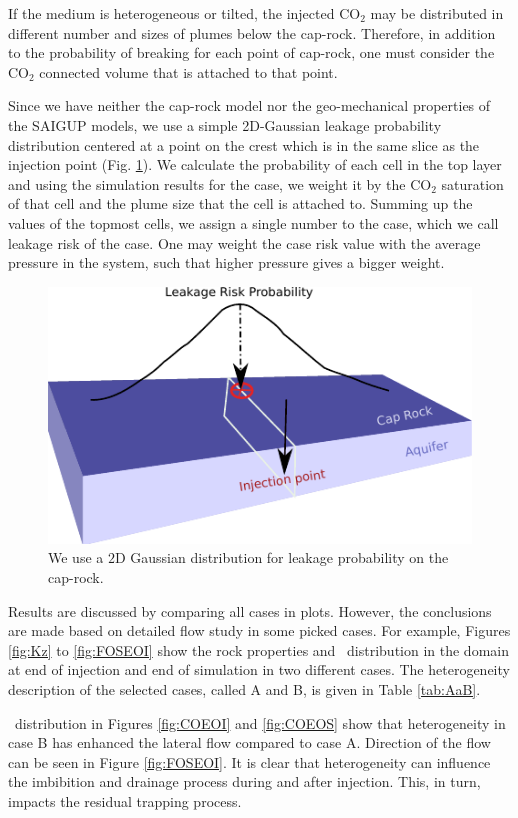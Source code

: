 If the medium is heterogeneous or tilted, the injected CO$_2$ may be distributed
in different number and sizes of plumes below the cap-rock. Therefore, in
addition to the probability of breaking for each point of cap-rock, one must
consider the CO$_2$ connected volume that is attached to that point. 

Since we have neither the cap-rock model nor the geo-mechanical properties of
the SAIGUP models, we use a simple 2D-Gaussian leakage probability distribution
centered at a point on the crest which is in the same slice as the injection
point (Fig. \ref{fig:SLR}). We calculate the probability of each cell in the top
layer and using the simulation results for the case, we weight it by the CO$_2$
saturation of that cell and the plume size that the cell is attached to.
Summing up the values of the topmost cells, we assign a single number to the
case, which we call leakage risk of the case. One may weight the case risk value
with the average pressure in the system, such that higher pressure gives a
bigger weight.
\vskip 0.5cm

\begin{figure}
  \centering
  \includegraphics[width=0.65 \linewidth]{./figurer/LR_2} 
  \caption{We use a $2\mbox{D}$ Gaussian distribution for leakage probability
on the cap-rock.}
  \label{fig:SLR}
%
\end{figure}

Results are discussed by comparing all cases in plots. However, the conclusions are made based on detailed flow study in some picked cases. For example, Figures \ref{fig:Kz} to \ref{fig:FOSEOI} show the rock properties and \coo\ distribution in the domain at end of injection and end of simulation in two different cases. The heterogeneity description of the selected cases, called A and B, is given in Table \ref{tab:AaB}.

\coo\ distribution in Figures \ref{fig:COEOI} and \ref{fig:COEOS} show that heterogeneity in case B has enhanced the lateral flow compared to case A. Direction of the flow can be seen in Figure \ref{fig:FOSEOI}. It is clear that heterogeneity can influence the imbibition and drainage process during and after injection. This, in turn, impacts the residual trapping process.

